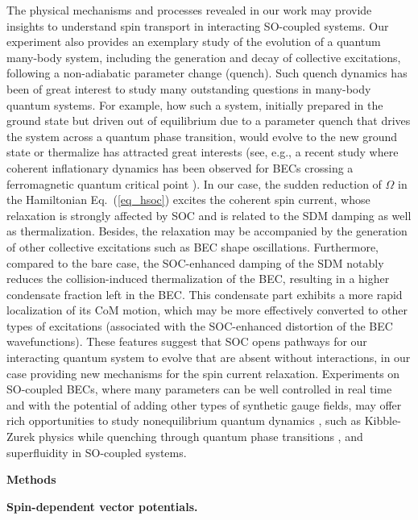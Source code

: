 \documentclass[showpacs,preprintnumbers,amsmath,amssymb, superscriptaddress, aps, reprint]{revtex4-1}
\begin{document}
{{{The physical mechanisms and processes revealed in our work may provide insights to understand spin transport in interacting SO-coupled systems. Our experiment also provides an exemplary study of the evolution of a quantum many-body system, including the generation and decay of collective excitations, following a non-adiabatic parameter change (quench). Such quench dynamics has been of great interest to study many outstanding questions in many-body quantum systems. For example, how such a system, initially prepared in the ground state but driven out of equilibrium due to a parameter quench that drives the system across a quantum phase transition, would evolve to the new ground state or thermalize has attracted great interests (see, e.g., a recent study where coherent inflationary dynamics has been observed for BECs crossing a ferromagnetic quantum critical point \cite{CoherentDynamic_Chin_NPhys2018}). In our case, the sudden reduction of $\Omega$ in the Hamiltonian Eq.~(\ref{eq_hsoc}) excites the coherent spin current, whose relaxation is strongly affected by SOC and is related to the SDM damping as well as thermalization. Besides, the relaxation may be accompanied by the generation of other collective excitations such as BEC shape oscillations. Furthermore, compared to the bare case, the SOC-enhanced damping of the SDM notably reduces the collision-induced thermalization of the BEC, resulting in a higher condensate fraction left in the BEC. This condensate part exhibits a more rapid localization of its CoM motion, which may be more effectively converted to other types of excitations (associated with the SOC-enhanced distortion of the BEC wavefunctions). These features suggest that SOC opens pathways for our interacting quantum system to evolve that are absent without interactions, in our case providing new mechanisms for the spin current relaxation. Experiments on SO-coupled BECs, where many parameters can be well controlled in real time and with the potential of adding other types of synthetic gauge fields, may offer rich opportunities to study nonequilibrium quantum dynamics \cite{Polkovnikov_ND_RevModPhys2011}, {such as Kibble-Zurek physics while quenching through quantum phase transitions} \cite{Kibble_Zurek_SOC_BEC_PhysRevA2017}, {and superfluidity} \cite{ExoticSuperfluid_EPL,Zhai_Review} {in SO-coupled systems.}

\begin{flushleft}
{\textbf{Methods}}
\end{flushleft}


\textbf{Spin-dependent vector potentials.}

}}}
\end{document}
